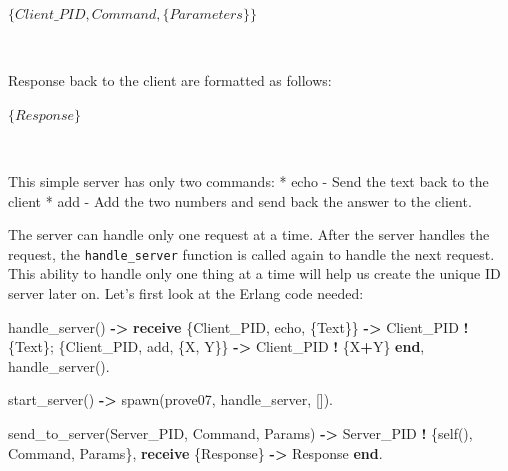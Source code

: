 \documentclass[
]{book}
\newenvironment{Shaded}{\begin{snugshade}}{\end{snugshade}}
\newcommand{\CharTok}[1]{\textcolor[rgb]{0.31,0.60,0.02}{#1}}
\newcommand{\FunctionTok}[1]{\textcolor[rgb]{0.00,0.00,0.00}{#1}}
\newcommand{\KeywordTok}[1]{\textcolor[rgb]{0.13,0.29,0.53}{\textbf{#1}}}
\newcommand{\OperatorTok}[1]{\textcolor[rgb]{0.81,0.36,0.00}{\textbf{#1}}}
\newcommand{\VariableTok}[1]{\textcolor[rgb]{0.00,0.00,0.00}{#1}}
\begin{document}
\begin{formulabox}
\(\lbrace Client\_PID, Command, \lbrace Parameters \rbrace \rbrace\)

\end{formulabox}

\(\nonumber\)

Response back to the client are formatted as follows:

\begin{formulabox}
\(\lbrace Response \rbrace\)

\end{formulabox}

\(\nonumber\)

This simple server has only two commands:
* echo - Send the text back to the client
* add - Add the two numbers and send back the answer to the client.

The server can handle only one request at a time. After the server handles the request, the \texttt{handle\_server} function is called again to handle the next request. This ability to handle only one thing at a time will help us create the unique ID server later on. Let's first look at the Erlang code needed:

\begin{Shaded}
\begin{Highlighting}[]
\FunctionTok{handle\_server()} \OperatorTok{{-}\textgreater{}}
    \KeywordTok{receive}
        \FunctionTok{\{}\VariableTok{Client\_PID}\FunctionTok{,} \CharTok{echo}\FunctionTok{,} \FunctionTok{\{}\VariableTok{Text}\FunctionTok{\}\}} \OperatorTok{{-}\textgreater{}} \VariableTok{Client\_PID} \OperatorTok{!} \FunctionTok{\{}\VariableTok{Text}\FunctionTok{\};}
        \FunctionTok{\{}\VariableTok{Client\_PID}\FunctionTok{,} \CharTok{add}\FunctionTok{,} \FunctionTok{\{}\VariableTok{X}\FunctionTok{,} \VariableTok{Y}\FunctionTok{\}\}} \OperatorTok{{-}\textgreater{}} \VariableTok{Client\_PID} \OperatorTok{!} \FunctionTok{\{}\VariableTok{X}\OperatorTok{+}\VariableTok{Y}\FunctionTok{\}}
    \KeywordTok{end}\FunctionTok{,}
    \FunctionTok{handle\_server().}

\FunctionTok{start\_server()} \OperatorTok{{-}\textgreater{}}
    \FunctionTok{spawn(}\CharTok{prove07}\FunctionTok{,} \CharTok{handle\_server}\FunctionTok{,} \FunctionTok{[]).}
 
\FunctionTok{send\_to\_server(}\VariableTok{Server\_PID}\FunctionTok{,} \VariableTok{Command}\FunctionTok{,} \VariableTok{Params}\FunctionTok{)} \OperatorTok{{-}\textgreater{}}
    \VariableTok{Server\_PID} \OperatorTok{!} \FunctionTok{\{self(),} \VariableTok{Command}\FunctionTok{,} \VariableTok{Params}\FunctionTok{\},}
    \KeywordTok{receive}
        \FunctionTok{\{}\VariableTok{Response}\FunctionTok{\}} \OperatorTok{{-}\textgreater{}} \VariableTok{Response}
    \KeywordTok{end}\FunctionTok{.}
\end{Highlighting}
\end{Shaded}
\end{document}
